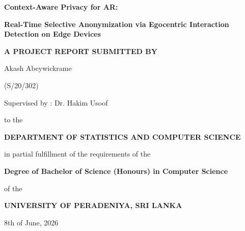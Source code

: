 \documentclass[12pt]{article}
\newcommand{\chapterstart}{\clearpage}
\begin{document}
\begin{titlepage}
  \centering
  {\Large\bfseries Context-Aware Privacy for AR:\par}
  {\Large\bfseries Real-Time Selective Anonymization via Egocentric Interaction Detection on Edge Devices\par}
  \vspace{2.5cm}
  {\large\bfseries A PROJECT REPORT SUBMITTED BY\par}
  \vspace{0.8cm}
  {\large Akash Abeywickrame\par}
  {\large (S/20/302)\par}
  {\large Supervised by : Dr. Hakim Usoof \par}
  \vspace{1.8cm}
  {\large to the\par}
  \vspace{0.6cm}
  {\large\bfseries DEPARTMENT OF STATISTICS AND COMPUTER SCIENCE\par}
  \vspace{1.2cm}
  {\large in partial fulfillment of the requirements of the\par}
  \vspace{0.6cm}
  {\large\bfseries Degree of Bachelor of Science (Honours) in Computer Science\par}
  \vspace{1.2cm}
  {\large of the\par}
  \vspace{0.6cm}
  {\large\bfseries UNIVERSITY OF PERADENIYA, SRI LANKA\par}
  \vfill
  {\large 8th of June, 2026\par}
\end{titlepage}

\onehalfspacing


\clearpage
\begin{singlespace}
\tableofcontents
\clearpage
\listoffigures
\clearpage
\listoftables
\end{singlespace}

\clearpage
{}

\chapterstart

\chapterstart

\chapterstart

\chapterstart


\chapterstart
\begin{singlespace}


\end{singlespace}
\end{document}
